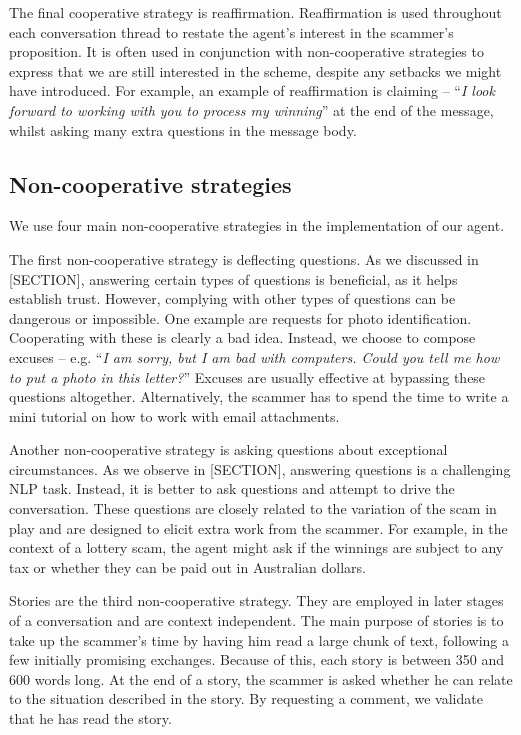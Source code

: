The final cooperative strategy is reaffirmation. Reaffirmation is used throughout each conversation thread to restate the agent's interest in the scammer's proposition. It is often used in conjunction with non-cooperative strategies to express that we are still interested in the scheme, despite any setbacks we might have introduced. For example, an example of reaffirmation is claiming -- ``\textit{I look forward to working with you to process my winning}'' at the end of the message, whilst asking many extra questions in the message body.

\subsection{Non-cooperative strategies}

We use four main non-cooperative strategies in the implementation of our agent.

The first non-cooperative strategy is deflecting questions. As we discussed in [SECTION], answering certain types of questions is beneficial, as it helps establish trust. However, complying with other types of questions can be dangerous or impossible. One example are requests for photo identification. Cooperating with these is clearly a bad idea. Instead, we choose to compose excuses -- e.g. ``\textit{I am sorry, but I am bad with computers. Could you tell me how to put a photo in this letter?}'' Excuses are usually effective at bypassing these questions altogether. Alternatively, the scammer has to spend the time to write a mini tutorial on how to work with email attachments. 

Another non-cooperative strategy is asking questions about exceptional circumstances. As we observe in [SECTION], answering questions is a challenging NLP task. Instead, it is better to ask questions and attempt to drive the conversation. These questions are closely related to the variation of the scam in play and are designed to elicit extra work from the scammer. For example, in the context of a lottery scam, the agent might ask if the winnings are subject to any tax or whether they can be paid out in Australian dollars.

Stories are the third non-cooperative strategy. They are employed in later stages of a conversation and are context independent. The main purpose of stories is to take up the scammer's time by having him read a large chunk of text, following a few initially promising exchanges. Because of this, each story is between 350 and 600 words long. At the end of a story, the scammer is asked whether he can relate to the situation described in the story. By requesting a comment, we validate that he has read the story.

